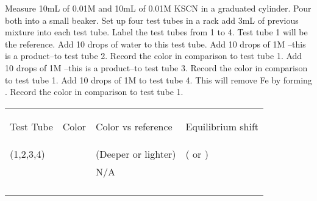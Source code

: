\documentclass[main.tex]{subfiles}
\begin{document}
\begin{center}
\end{center}

\begin{steps}
    \newstep[] Measure 10mL of 0.01M  and 10mL of 0.01M KSCN in a graduated cylinder. Pour both into a small beaker. Set up four test tubes in a rack add 3mL of previous mixture into each test tube. Label the test tubes from 1 to 4.
        \newstep[]  Test tube 1 will be the reference. Add 10 drops of water to this test tube. 
        \newstep[]  Add 10 drops of 1M --this is a product--to test tube 2. Record the color in comparison to test tube 1.
                \newstep[]  Add 10 drops of 1M --this is a product--to test tube 3. Record the color in comparison to test tube 1.
        \newstep[]  Add 10 drops of 1M  to test tube 4. This will remove Fe  by forming . Record the color in comparison to test tube 1.

\end{steps}

\begin{center}\resizebox{18cm}{!} {\begin{tabular}{ |p{4cm}|p{4cm}|p{4cm}|p{4cm}|  }
\hline
      \begin{center}Test Tube\end{center} &  \begin{center}Color\end{center}  &  \begin{center}Color vs reference\end{center}  & \begin{center}Equilibrium shift\end{center}        \\
            {\small (1,2,3,4)} &   & {\small (Deeper or lighter)  }& {\small (\ce{->} or \ce{<-} )  }     \\

\hline
   \vspace{0cm} \vspace{.25cm} &     & N/A  &          \\\hline
   \vspace{0cm} \vspace{.25cm} &     &   &          \\\hline
   \vspace{0cm} \vspace{.25cm} &     &   &          \\\hline
   \vspace{0cm} \vspace{.25cm} &     &   &          \\\hline
   \vspace{0cm} \vspace{.25cm} &     &   &          \\\hline


\end{tabular}}\end{center}
\end{document}

